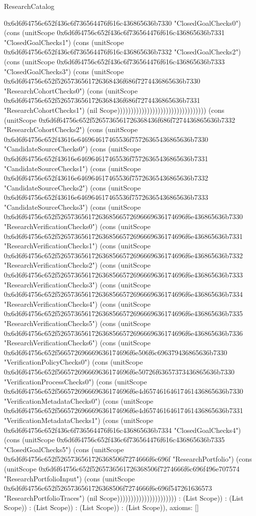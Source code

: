\begin{lexlean}{ResearchCatalog}
\begin{semanticmodule}
{0x6d6f64756c652f436c6f736564476f616c436865636b7330 "ClosedGoalChecks0") (cons (unitScope 0x6d6f64756c652f436c6f736564476f616c436865636b7331 "ClosedGoalChecks1") (cons (unitScope 0x6d6f64756c652f436c6f736564476f616c436865636b7332 "ClosedGoalChecks2") (cons (unitScope 0x6d6f64756c652f436c6f736564476f616c436865636b7333 "ClosedGoalChecks3") (cons (unitScope 0x6d6f64756c652f5265736561726368436f686f7274436865636b7330 "ResearchCohortChecks0") (cons (unitScope 0x6d6f64756c652f5265736561726368436f686f7274436865636b7331 "ResearchCohortChecks1") (nil Scope))))))))))))))))))))))))))))))))) (cons (unitScope 0x6d6f64756c652f5265736561726368436f686f7274436865636b7332 "ResearchCohortChecks2") (cons (unitScope 0x6d6f64756c652f43616e646964617465536f75726365436865636b7330 "CandidateSourceChecks0") (cons (unitScope 0x6d6f64756c652f43616e646964617465536f75726365436865636b7331 "CandidateSourceChecks1") (cons (unitScope 0x6d6f64756c652f43616e646964617465536f75726365436865636b7332 "CandidateSourceChecks2") (cons (unitScope 0x6d6f64756c652f43616e646964617465536f75726365436865636b7333 "CandidateSourceChecks3") (cons (unitScope 0x6d6f64756c652f5265736561726368566572696669636174696f6e436865636b7330 "ResearchVerificationChecks0") (cons (unitScope 0x6d6f64756c652f5265736561726368566572696669636174696f6e436865636b7331 "ResearchVerificationChecks1") (cons (unitScope 0x6d6f64756c652f5265736561726368566572696669636174696f6e436865636b7332 "ResearchVerificationChecks2") (cons (unitScope 0x6d6f64756c652f5265736561726368566572696669636174696f6e436865636b7333 "ResearchVerificationChecks3") (cons (unitScope 0x6d6f64756c652f5265736561726368566572696669636174696f6e436865636b7334 "ResearchVerificationChecks4") (cons (unitScope 0x6d6f64756c652f5265736561726368566572696669636174696f6e436865636b7335 "ResearchVerificationChecks5") (cons (unitScope 0x6d6f64756c652f5265736561726368566572696669636174696f6e436865636b7336 "ResearchVerificationChecks6") (cons (unitScope 0x6d6f64756c652f566572696669636174696f6e506f6c696379436865636b7330 "VerificationPolicyChecks0") (cons (unitScope 0x6d6f64756c652f566572696669636174696f6e50726f63657373436865636b7330 "VerificationProcessChecks0") (cons (unitScope 0x6d6f64756c652f566572696669636174696f6e4d65746164617461436865636b7330 "VerificationMetadataChecks0") (cons (unitScope 0x6d6f64756c652f566572696669636174696f6e4d65746164617461436865636b7331 "VerificationMetadataChecks1") (cons (unitScope 0x6d6f64756c652f436c6f736564476f616c436865636b7334 "ClosedGoalChecks4") (cons (unitScope 0x6d6f64756c652f436c6f736564476f616c436865636b7335 "ClosedGoalChecks5") (cons (unitScope 0x6d6f64756c652f5265736561726368506f7274666f6c696f "ResearchPortfolio") (cons (unitScope 0x6d6f64756c652f5265736561726368506f7274666f6c696f496e707574 "ResearchPortfolioInput") (cons (unitScope 0x6d6f64756c652f5265736561726368506f7274666f6c696f547261636573 "ResearchPortfolioTraces") (nil Scope)))))))))))))))))))))) : (List Scope)) : (List Scope)) : (List Scope)) : (List Scope)) : (List Scope)),
  axioms: []
}


\end{semanticmodule}
\end{lexlean}
